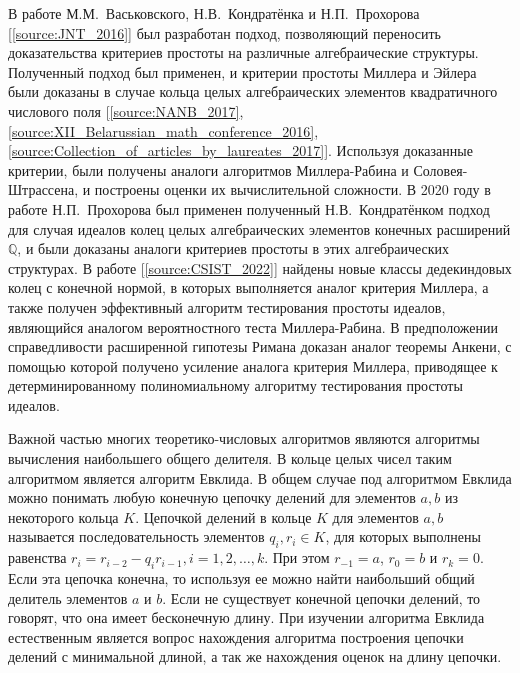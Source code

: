 \documentclass[_00_dissertation.tex]{subfiles}
\begin{document}
В работе М.М.~Васьковского, Н.В.~Кондратёнка и Н.П.~Прохорова [\ref{source:JNT_2016}] был разработан подход, позволяющий переносить доказательства критериев простоты на различные алгебраические структуры.
Полученный подход был применен, и критерии простоты Миллера и Эйлера были доказаны в случае кольца целых алгебраических элементов квадратичного числового поля [\ref{source:NANB_2017}, \ref{source:XII_Belarussian_math_conference_2016}, \ref{source:Collection_of_articles_by_laureates_2017}].
Используя доказанные критерии, были получены аналоги алгоритмов Миллера-Рабина и Соловея-Штрассена, и построены оценки их вычислительной сложности.
В 2020 году в работе Н.П.~Прохорова \cite{source:Prochorov} был применен полученный Н.В.~Кондратёнком подход для случая идеалов колец целых алгебраических элементов конечных расширений $\mathbb{Q}$, и были доказаны аналоги критериев простоты в этих алгебраических структурах.
В работе [\ref{source:CSIST_2022}] найдены новые классы дедекиндовых колец с конечной нормой, в которых выполняется аналог критерия Миллера, а также получен эффективный алгоритм тестирования простоты идеалов, являющийся аналогом вероятностного теста Миллера-Рабина.
В предположении справедливости расширенной гипотезы Римана доказан аналог теоремы Анкени, с помощью которой получено усиление аналога критерия Миллера, приводящее к детерминированному полиномиальному алгоритму тестирования простоты идеалов.


Важной частью многих теоретико-числовых алгоритмов являются алгоритмы вычисления наибольшего общего делителя.
В кольце целых чисел таким алгоритмом является алгоритм Евклида.
В общем случае под алгоритмом Евклида можно понимать любую конечную цепочку делений для элементов $a, b$ из некоторого кольца $K$.
Цепочкой делений в кольце $K$ для элементов $a, b$ называется последовательность элементов $q_i, r_i \in K$, для которых выполнены равенства $r_i=r_{i-2}-q_i r_{i-1}, i = 1, 2, \ldots, k$.
При этом $r_{-1} = a$, $r_0 = b$ и $r_k=0$.
Если эта цепочка конечна, то используя ее можно найти наибольший общий делитель элементов $a$ и $b$.
Если не существует конечной цепочки делений, то говорят, что она имеет бесконечную длину.
При изучении алгоритма Евклида естественным является вопрос нахождения алгоритма построения цепочки делений с минимальной длиной, а так же нахождения оценок на длину цепочки.
\end{document}
